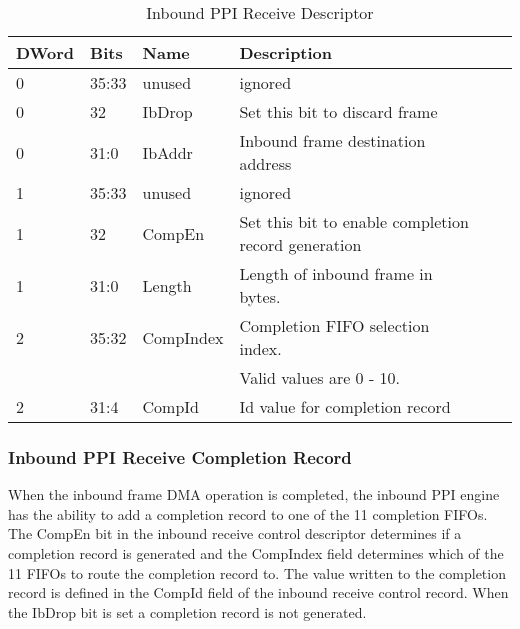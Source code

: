 \documentclass[11pt]{article}
\begin{document}
\begin{table}[H]
\small
\centering
   \begin{tabular}{| l | l | l | l | l | l | } 
      \hline \textbf{DWord} & \textbf{Bits} & \textbf{Name} & \textbf{Description} \\
      \hline 0              & 35:33         & unused        & ignored                           \\
      \hline 0              & 32            & IbDrop        & Set this bit to discard frame     \\
      \hline 0              & 31:0          & IbAddr        & Inbound frame destination address \\
      \hline 1              & 35:33         & unused        & ignored                           \\
      \hline 1              & 32            & CompEn        & Set this bit to enable completion record generation \\
      \hline 1              & 31:0          & Length        & Length of inbound frame in bytes. \\
      \hline 2              & 35:32         & CompIndex     & Completion FIFO selection index.  \\
                            &               &               & Valid values are 0 - 10.          \\
      \hline 2              & 31:4          & CompId        & Id value for completion record    \\
      \hline
   \end{tabular}
   \caption{Inbound PPI Receive Descriptor}
   \label{tab:ib_ppi_cntrl}
\end{table}

\subsubsection{Inbound PPI Receive Completion Record}

When the inbound frame DMA operation is completed, the inbound PPI engine has the ability to add a completion record to one of the 11 
completion FIFOs. The CompEn bit in the inbound receive control descriptor determines if a completion record is 
generated and the CompIndex field determines which of the 11 FIFOs to route the completion record to. The value written 
to the completion record is defined in the CompId field of the inbound receive control record. When the IbDrop bit is set
a completion record is not generated.
\end{document}
